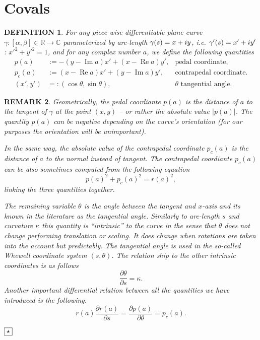 \documentclass[10pt,a4paper,reqno]{amsart}
\newtheorem{defi}{\bf D\scriptsize EFINITION \normalsize}
\newtheorem{rem}[defi]{\bf R\scriptsize EMARK \normalsize}
\def\kopr{\hfill\raisebox{3pt}{\framebox{$\star$}}}
\newenvironment{remark}{\begin{rem}\rm}{$\kopr$\end{rem}}
\newenvironment{definition}{\begin{defi}\rm}{\end{defi}}
\newcommand{\imag}{{\rm i}}
\renewcommand\Re{\operatorname{Re}}
\renewcommand\Im{\operatorname{Im}}
\begin{document}
\section{Covals}\label{covalsec}
\begin{definition}
For any piece-wise differentiable plane curve $\gamma: [\alpha,\beta]\in \mathbb{R}\to \mathbb{C}$ parameterized by arc-length $\gamma(s)=x+\imag y$, i.e. $\gamma'(s)=x'+\imag y'$: $x'^2+y'^2=1$, and for any complex number $a$, we define the following quantities
\begin{align}
p(a)&:=-(y-\Im a) x'+(x-\Re a) y', & \text{pedal coordinate,}\\
p_c(a)&:=(x-\Re a) x'+(y-\Im a) y', & \text{contrapedal coordinate.}\\
(x',y')&=:(\cos \theta, \sin \theta), & \text{$\theta$ tangential angle.}
\end{align}
\end{definition}
\begin{remark}
Geometrically, the pedal coordiante $p(a)$ is the distance of $a$ to the tangent of $\gamma$ at the point $(x,y)$ -- or rather the absolute value $|p(a)|$. The quantity $p(a)$ can be negative depending on the curve's orientation (for our purposes the orientation will be unimportant). 

In the same way, the absolute value of the contrapedal coordinate $p_c(a)$ is the distance of $a$ to the \textit{normal} instead of tangent. The contrapedal coordiante $p_c(a)$ can be also sometimes computed from the following equation
$$
p(a)^2+p_c(a)^2=r(a)^2,
$$
linking the three quantities together.

The remaining variable $\theta$ is the angle between the tangent and $x$-axis and its known in the literature as the tangential angle. Similarly to arc-length $s$ and curvature $\kappa$ this quantity is ``intrinsic'' to the curve in the sense that $\theta$ does not change performing translation or scaling. It does change when rotations are taken into the account but predictably. The tangential angle is used in the so-called Whewell coordinate system $(s,\theta)$. The relation ship to the other intrinsic coordinates is as follows
$$
\frac{\partial \theta}{\partial s}=\kappa.
$$
Another important differential relation between all the quantities we have introduced is the following.
\begin{equation}\label{diffrules}
r(a)\frac{\partial r(a)}{\partial s}=\frac{\partial p(a)}{\partial \theta}=p_c(a).
\end{equation}

\end{remark} 
\end{document}
